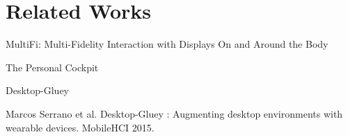 \section{Related Works}

\begin{frame}{MultiFi: Multi-Fidelity Interaction with Displays On and Around the Body}
\end{frame}

\begin{frame}{The Personal Cockpit}
\end{frame}

\begin{frame}{Desktop-Gluey}
  \threecols
    {}
    {}
    {}
  \begin{center}
    Marcos Serrano et al. Desktop-Gluey : Augmenting desktop environments with wearable devices. MobileHCI 2015.
  \end{center}
\end{frame}